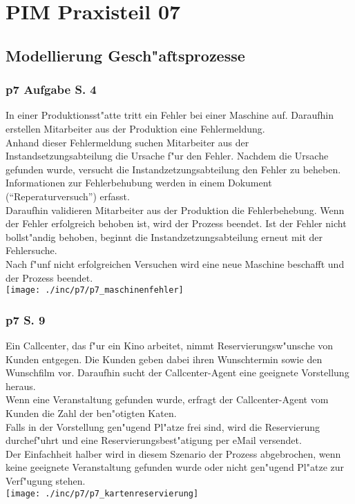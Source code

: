 
\chapter{PIM Praxisteil 07}

\section{Modellierung Gesch"aftsprozesse}

\subsection{p7 Aufgabe S. 4}

In einer Produktionsst"atte tritt ein Fehler bei einer Maschine auf.
Daraufhin erstellen Mitarbeiter aus der Produktion eine Fehlermeldung.\\
Anhand dieser Fehlermeldung suchen Mitarbeiter aus der Instandsetzungsabteilung die Ursache f"ur den Fehler.
Nachdem die Ursache gefunden wurde, versucht die Instandzetzungsabteilung den Fehler zu beheben.
Informationen zur Fehlerbehubung werden in einem Dokument ("`Reperaturversuch"') erfasst.\\
Daraufhin validieren Mitarbeiter aus der Produktion die Fehlerbehebung.
Wenn der Fehler erfolgreich behoben ist, wird der Prozess beendet.
Ist der Fehler nicht bollst"andig behoben, beginnt die Instandzetzungsabteilung erneut mit der Fehlersuche.\\
Nach f"unf nicht erfolgreichen Versuchen wird eine neue Maschine beschafft und der Prozess beendet.\\

\texttt{[image: ./inc/p7/p7\_maschinenfehler]}


\subsection{p7 S. 9}

Ein Callcenter, das f"ur ein Kino arbeitet, nimmt Reservierungsw"unsche von Kunden entgegen.
Die Kunden geben dabei ihren Wunschtermin sowie den Wunschfilm vor.
Daraufhin sucht der Callcenter-Agent eine geeignete Vorstellung heraus.\\
Wenn eine Veranstaltung gefunden wurde, erfragt der Callcenter-Agent vom Kunden die Zahl der ben"otigten Katen.\\
Falls in der Vorstellung gen"ugend Pl"atze frei sind, wird die Reservierung durchef"uhrt und eine Reservierungsbest"atigung per eMail versendet.\\
Der Einfachheit halber wird in diesem Szenario der Prozess abgebrochen, wenn keine geeignete Veranstaltung gefunden wurde oder nicht gen"ugend Pl"atze zur Verf"ugung stehen.\\

\texttt{[image: ./inc/p7/p7\_kartenreservierung]}

